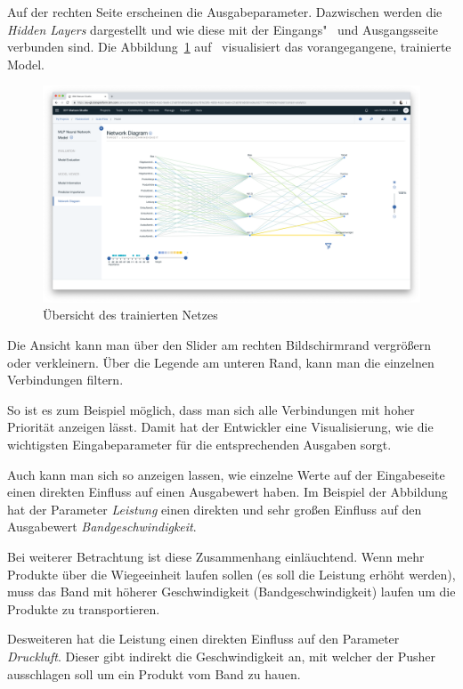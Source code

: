 Auf der rechten Seite erscheinen die Ausgabeparameter. Dazwischen werden die \textit{Hidden Layers} dargestellt und wie
diese mit der Eingangs"~ und Ausgangsseite verbunden sind. Die Abbildung~\ref{fig:umsetzung_model_network_diagram}
auf~\pageref{fig:umsetzung_model_network_diagram} visualisiert das vorangegangene, trainierte Model.

\begin{figure}[h]
    \centering
    \includegraphics[width=\textwidth]{images/kapitel_3/model_network_diagram.png}
    \caption{Übersicht des trainierten Netzes}
    \label{fig:umsetzung_model_network_diagram}
\end{figure}

Die Ansicht kann man über den Slider am rechten Bildschirmrand vergrößern oder verkleinern. Über die Legende am unteren
Rand, kann man die einzelnen Verbindungen filtern.

So ist es zum Beispiel möglich, dass man sich alle Verbindungen mit hoher Priorität anzeigen lässt. Damit hat der
Entwickler eine Visualisierung, wie die wichtigsten Eingabeparameter für die entsprechenden Ausgaben sorgt.

Auch kann man sich so anzeigen lassen, wie einzelne Werte auf der Eingabeseite einen direkten Einfluss auf einen
Ausgabewert haben. Im Beispiel der Abbildung hat der Parameter \textit{Leistung} einen direkten und sehr großen
Einfluss auf den Ausgabewert \textit{Bandgeschwindigkeit}.

Bei weiterer Betrachtung ist diese Zusammenhang einläuchtend. Wenn mehr Produkte über die Wiegeeinheit laufen sollen (es
soll die Leistung erhöht werden), muss das Band mit höherer Geschwindigkeit (Bandgeschwindigkeit) laufen um die Produkte
zu transportieren.

Desweiteren hat die Leistung einen direkten Einfluss auf den Parameter \textit{Druckluft}. Dieser gibt indirekt die
Geschwindigkeit an, mit welcher der Pusher ausschlagen soll um ein Produkt vom Band zu hauen.

